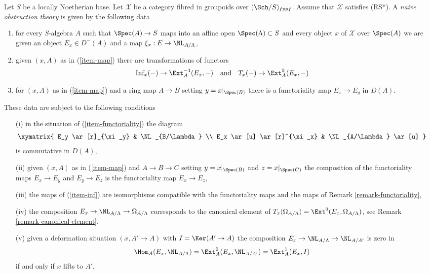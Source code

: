 \begin{definition}
\label{definition-naive-obstruction-theory}
Let $S$ be a locally Noetherian base. Let $\mathcal{X}$ be a category fibred
in groupoids over $(\Sch/S)_{fppf}$. Assume that $\mathcal{X}$
satisfies (RS*). A {\it naive obstruction theory} is 
given by the following data
\begin{enumerate}
\item
\label{item-map}
for every $S$-algebra $A$ such that $\Spec(A) \to S$
maps into an affine open $\Spec(\Lambda) \subset S$ and every object $x$
of $\mathcal{X}$ over $\Spec(A)$ we are given an object $E_x \in D^-(A)$
and a map $\xi_x : E \to \NL_{A/\Lambda}$,
\item
\label{item-inf}
given $(x, A)$ as in (\ref{item-map}) there are transformations of
functors
$$
\text{Inf}_x( - ) \to \Ext^{-1}_A(E_x, -)
\quad\text{and}\quad
T_x(-) \to \Ext^0_A(E_x, -)
$$
\item
\label{item-functoriality}
for $(x, A)$ as in (\ref{item-map}) and a ring map $A \to B$
setting $y = x|_{\Spec(B)}$ there is a functoriality map
$E_x \to E_y$ in $D(A)$.
\end{enumerate}
These data are subject to the following conditions
\begin{enumerate}
\item[(i)]
in the situation of (\ref{item-functoriality}) the diagram
$$
\xymatrix{
E_y \ar[r]_{\xi_y} & \NL_{B/\Lambda} \\
E_x \ar[u] \ar[r]^{\xi_x} & \NL_{A/\Lambda} \ar[u]
}
$$
is commutative in $D(A)$,
\item[(ii)]
given $(x, A)$ as in (\ref{item-map}) and $A \to B \to C$
setting $y = x|_{\Spec(B)}$ and $z = x|_{\Spec(C)}$ the
composition of the functoriality maps $E_x \to E_y$ and $E_y \to E_z$ is
the functoriality map $E_x \to E_z$,
\item[(iii)]
the maps of (\ref{item-inf}) are isomorphisms
compatible with the functoriality
maps and the maps of Remark \ref{remark-functoriality},
\item[(iv)]
the composition $E_x \to \NL_{A/\Lambda} \to \Omega_{A/\Lambda}$
corresponds to the canonical element of
$T_x(\Omega_{A/\Lambda}) = \Ext^0(E_x, \Omega_{A/\Lambda})$, see
Remark \ref{remark-canonical-element},
\item[(v)]
given a deformation situation $(x, A' \to A)$ with $I = \Ker(A' \to A)$
the composition $E_x \to \NL_{A/\Lambda} \to \NL_{A/A'}$ is zero in
$$
\Hom_A(E_x, \NL_{A/\Lambda}) = \Ext^0_A(E_x, \NL_{A/A'}) =
\Ext^1_A(E_x, I)
$$
if and only if $x$ lifts to $A'$.
\end{enumerate}
\end{definition}

